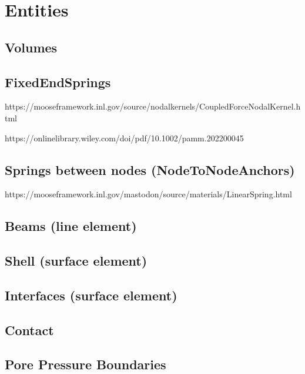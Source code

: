 \section{Entities}

\subsection{Volumes}
\label{chap:entities-volume}

\subsection{FixedEndSprings}
\label{chap:entities-fixed-end-springs}

https://mooseframework.inl.gov/source/nodalkernels/CoupledForceNodalKernel.html

https://onlinelibrary.wiley.com/doi/pdf/10.1002/pamm.202200045

\subsection{Springs between nodes (NodeToNodeAnchors)}
\label{chap:entities-springs}

https://mooseframework.inl.gov/mastodon/source/materials/LinearSpring.html

\subsection{Beams (line element)}
\label{chap:entities-beams}


\subsection{Shell (surface element)}
\label{chap:entities-shell}

\subsection{Interfaces (surface element)}

\subsection{Contact}

\subsection{Pore Pressure Boundaries}
